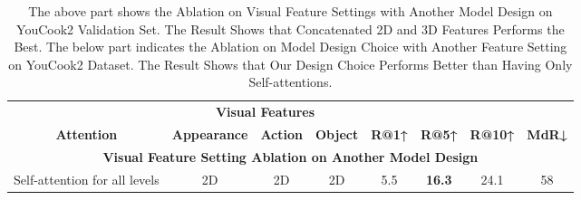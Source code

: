 \documentclass[lettersize,journal]{IEEEtran}
\begin{document}
\begin{table*}[!htb]
\centering
\caption{The above part shows the Ablation on Visual Feature Settings with Another Model Design on YouCook2 Validation Set. The Result Shows that Concatenated 2D and 3D Features Performs the Best.
The below part indicates the Ablation on Model Design Choice with Another Feature Setting on YouCook2 Dataset. The Result Shows that Our Design Choice Performs Better than Having Only Self-attentions.}
\label{tab:yc2_abl_extra}
\begin{tabular}{|cccccccc|}
\hline
\multicolumn{1}{|c|}{}                                                                                                                          & \multicolumn{3}{c|}{\textbf{Visual  Features}}                                                                         & \multicolumn{1}{c|}{}                                & \multicolumn{1}{c|}{}                                & \multicolumn{1}{c|}{}                                 &                                 \\ \cline{2-4}
\multicolumn{1}{|c|}{\multirow{-2}{*}{\textbf{Attention}}}                                                                                      & \multicolumn{1}{c|}{\textbf{Appearance}} & \multicolumn{1}{c|}{\textbf{Action}} & \multicolumn{1}{c|}{\textbf{Object}} & \multicolumn{1}{c|}{\multirow{-2}{*}{\textbf{R@1↑}}} & \multicolumn{1}{c|}{\multirow{-2}{*}{\textbf{R@5↑}}} & \multicolumn{1}{c|}{\multirow{-2}{*}{\textbf{R@10↑}}} & \multirow{-2}{*}{\textbf{MdR↓}} \\ \hline \hline
\multicolumn{8}{|c|}{\cellcolor[HTML]{EFEFEF}\textbf{Visual Feature Setting Ablation on Another Model Design}}                                                                                                                                                                                                                                                                                                                                                                   \\ \hline
\multicolumn{1}{|c|}{Self-attention for all levels}                                                                                             & \multicolumn{1}{c|}{2D}                  & \multicolumn{1}{c|}{2D}              & \multicolumn{1}{c|}{2D}              & \multicolumn{1}{c|}{5.5}                             & \multicolumn{1}{c|}{\textbf{16.3}}                   & \multicolumn{1}{c|}{24.1}                             & 58                              \\ \hline

\end{tabular}
\end{table*}
\end{document}
